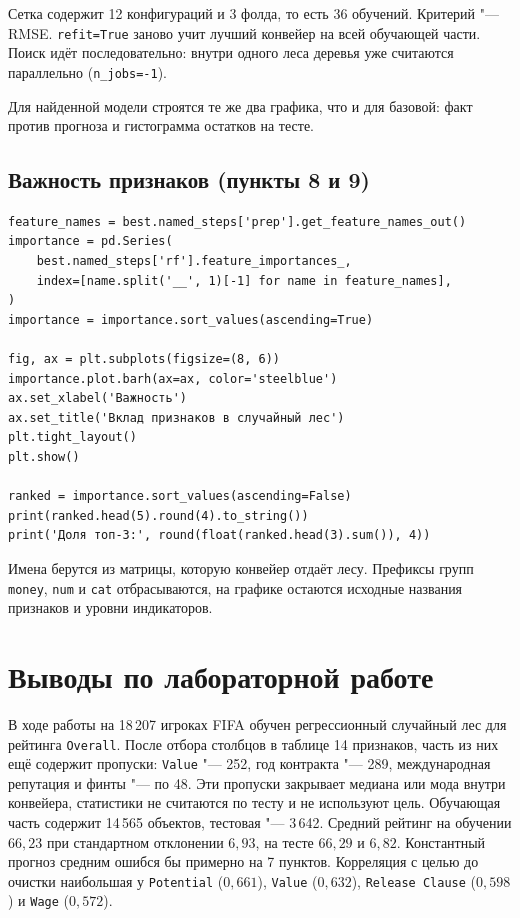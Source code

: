 \documentclass[14pt]{extarticle}
\begin{document}
Сетка содержит 12 конфигураций и 3 фолда, то есть 36 обучений. Критерий "--- RMSE. \texttt{refit=True} заново учит лучший конвейер на всей обучающей части. Поиск идёт последовательно: внутри одного леса деревья уже считаются параллельно (\texttt{n\_jobs=-1}).

Для найденной модели строятся те же два графика, что и для базовой: факт против прогноза и гистограмма остатков на тесте.

\subsection{Важность признаков (пункты 8 и 9)}
\begin{verbatim}
feature_names = best.named_steps['prep'].get_feature_names_out()
importance = pd.Series(
    best.named_steps['rf'].feature_importances_,
    index=[name.split('__', 1)[-1] for name in feature_names],
)
importance = importance.sort_values(ascending=True)

fig, ax = plt.subplots(figsize=(8, 6))
importance.plot.barh(ax=ax, color='steelblue')
ax.set_xlabel('Важность')
ax.set_title('Вклад признаков в случайный лес')
plt.tight_layout()
plt.show()

ranked = importance.sort_values(ascending=False)
print(ranked.head(5).round(4).to_string())
print('Доля топ-3:', round(float(ranked.head(3).sum()), 4))
\end{verbatim}

Имена берутся из матрицы, которую конвейер отдаёт лесу. Префиксы групп \texttt{money}, \texttt{num} и \texttt{cat} отбрасываются, на графике остаются исходные названия признаков и уровни индикаторов.

\newpage
\section{Выводы по лабораторной работе}

В ходе работы на 18\,207 игроках FIFA обучен регрессионный случайный лес для рейтинга \texttt{Overall}. После отбора столбцов в таблице 14 признаков, часть из них ещё содержит пропуски: \texttt{Value} "--- 252, год контракта "--- 289, международная репутация и финты "--- по 48. Эти пропуски закрывает медиана или мода внутри конвейера, статистики не считаются по тесту и не используют цель. Обучающая часть содержит 14\,565 объектов, тестовая "--- 3\,642. Средний рейтинг на обучении $66{,}23$ при стандартном отклонении $6{,}93$, на тесте $66{,}29$ и $6{,}82$. Константный прогноз средним ошибся бы примерно на 7 пунктов. Корреляция с целью до очистки наибольшая у \texttt{Potential} ($0{,}661$), \texttt{Value} ($0{,}632$), \texttt{Release Clause} ($0{,}598$) и \texttt{Wage} ($0{,}572$).
\end{document}
